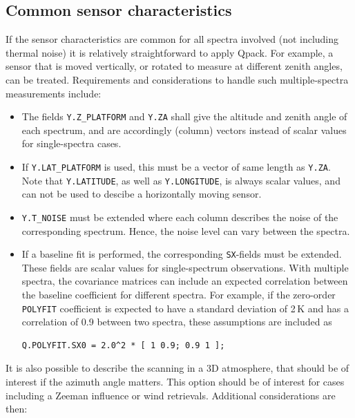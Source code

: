 \documentclass[a4paper,11pt]{article}
\begin{document}
\subsection{Common sensor characteristics}
%
If the sensor characteristics are common for all spectra involved (not
including thermal noise) it is relatively straightforward to apply Qpack. For
example, a sensor that is moved vertically, or rotated to measure at
different zenith angles, can be treated. Requirements and considerations to
handle such multiple-spectra measurements include:
\begin{itemize}
\item The fields \verb|Y.Z_PLATFORM| and \verb|Y.ZA| shall give the altitude
  and zenith angle of each spectrum, and are accordingly (column) vectors
  instead of scalar values for single-spectra cases. 
\item If \verb|Y.LAT_PLATFORM| is used, this must be a vector of same length as
  \verb|Y.ZA|. Note that \verb|Y.LATITUDE|, as well as \verb|Y.LONGITUDE|, is
  always scalar values, and can not be used to descibe a horizontally moving
  sensor.
\item \verb|Y.T_NOISE| must be extended where each column describes the noise
  of the corresponding spectrum. Hence, the noise level can vary between the
  spectra.
\item If a baseline fit is performed, the corresponding \verb|SX|-fields must
  be extended. These fields are scalar values for single-spectrum
  observations. With multiple spectra, the covariance matrices can include an
  expected correlation between the baseline coefficient for different spectra.
  For example, if the zero-order \verb|POLYFIT| coefficient is expected to have
  a standard deviation of 2\,K and has a correlation of 0.9 between two
  spectra, these assumptions are included as
\begin{verbatim}
Q.POLYFIT.SX0 = 2.0^2 * [ 1 0.9; 0.9 1 ];
\end{verbatim}
\end{itemize}
It is also possible to describe the scanning in a 3D atmosphere, that should be
of interest if the azimuth angle matters. This option should be of interest for
cases including a Zeeman influence or wind retrievals. Additional
considerations are then:
\end{document}

